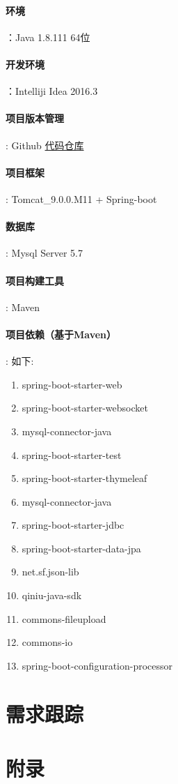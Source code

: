 \documentclass[UTF8]{ctexart}
\begin{document}
\paragraph{环境}：Java 1.8.111 64位
\paragraph{开发环境}：Intelliji Idea 2016.3
\paragraph{项目版本管理}: Github \href{https://github.com/Hjyheart/Xian-Huo}{代码仓库}
\paragraph{项目框架}: Tomcat\_9.0.0.M11 + Spring-boot
\paragraph{数据库}: Mysql Server 5.7
\paragraph{项目构建工具}: Maven
\paragraph{项目依赖（基于Maven）}:
如下:\\
\begin{enumerate}[1)]
\item spring-boot-starter-web
\item spring-boot-starter-websocket
\item mysql-connector-java
\item spring-boot-starter-test
\item spring-boot-starter-thymeleaf
\item mysql-connector-java
\item spring-boot-starter-jdbc
\item spring-boot-starter-data-jpa
\item net.sf.json-lib
\item qiniu-java-sdk
\item commons-fileupload
\item commons-io
\item spring-boot-configuration-processor
\end{enumerate}
\section{需求跟踪}
\section{附录}
\end{document}
